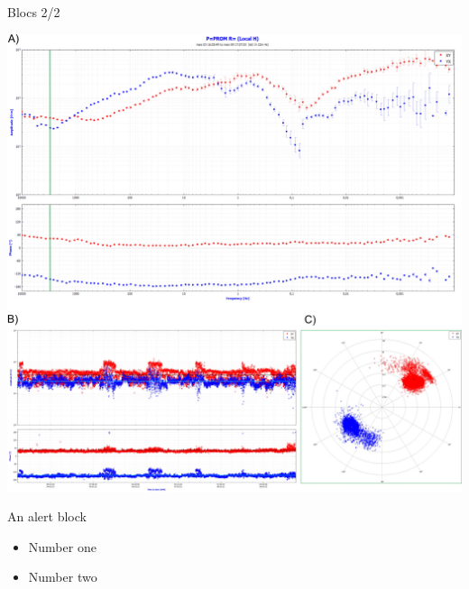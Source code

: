 \documentclass[11pt]{beamer}
\begin{document}
\begin{frame}{Blocs 2/2}
	\begin{center}
		\includegraphics[width = .35\textwidth]{phd-isterre-poster-2023-fig.jpg}
	\end{center}
	\begin{alertblock} {An alert block}
		\begin{itemize}
			\item Number one
			\item Number two
		\end{itemize}
	\end{alertblock}
\end{frame}
\end{document}
